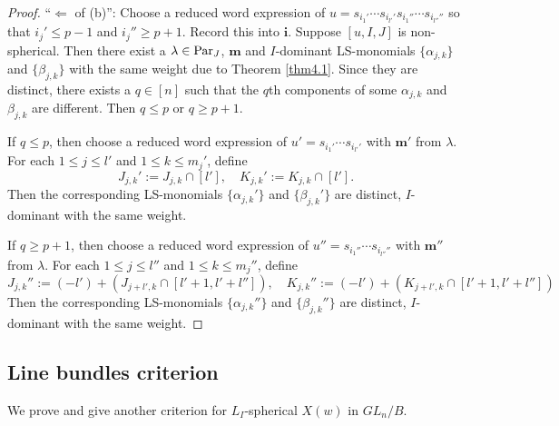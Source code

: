 \documentclass[12pt]{amsart}
\theoremstyle{definition}
\theoremstyle{remark}
\newcommand{\Parj}{{\rm Par}_J}
\begin{document}
\begin{proof}
``$\Leftarrow$ of (b)'': Choose a reduced word expression of $u  = s_{i_1 '} \cdots s_{i_{l'}'} s_{i_1 ''} \cdots s_{i_{l''}''}$ so that $i_j ' \leq p-1$ and $i_j'' \geq p+1$. Record this into $\mathbf{i}$. Suppose $[u,I,J]$ is non-spherical. Then there exist a $\lambda \in \Parj$, $\mathbf{m}$ and $I$-dominant LS-monomials $\{\alpha_{j,k}\}$ and $\{\beta_{j,k}\}$ with the same weight due to Theorem \ref{thm4.1}. Since they are distinct, there exists a $q \in [n]$ such that the $q$th components of some $\alpha_{j,k}$ and $\beta_{j,k}$ are different. Then $q \leq p$ or $q \geq p+1$.

If $q \leq p$, then choose a reduced word expression of $u' = s_{i_1'} \cdots s_{i_{l'}'}$ with $\mathbf{m'}$ from $\lambda$. For each $1 \leq j \leq l'$ and $1 \leq k \leq m_j'$, define
\begin{equation}
J_{j,k}' := J_{j,k} \cap [l'], \quad K_{j,k}':= K_{j,k}\cap [l'].
\end{equation}
Then the corresponding LS-monomials $\{ \alpha_{j,k}' \}$ and $\{ \beta_{j,k}'\}$ are distinct, $I$-dominant with the same weight.

If $q \geq p+1$, then choose a reduced word expression of $u'' = s_{i_1''} \cdots s_{i_{l''}''}$ with $\mathbf{m''}$ from $\lambda$. For each $1 \leq j \leq l''$ and $1 \leq k \leq m_j''$, define
\begin{equation}
J_{j,k}'' := (-l')+(J_{j+l',k} \cap [l'+1 , l'+l'']) , \quad K_{j,k}'' := (-l')+(K_{j+l',k} \cap [l'+1 , l'+l'']) 
\end{equation}
Then the corresponding LS-monomials $\{ \alpha_{j,k}'' \}$ and $\{ \beta_{j,k}''\}$ are distinct, $I$-dominant with the same weight.
\end{proof}



\subsection{Line bundles criterion}\label{sub4.2}

We prove \citep[Conjecture 4.19]{MR4394321} and give another criterion for $L_I$-spherical $X(w)$ in $GL_n / B$.
\end{document}
